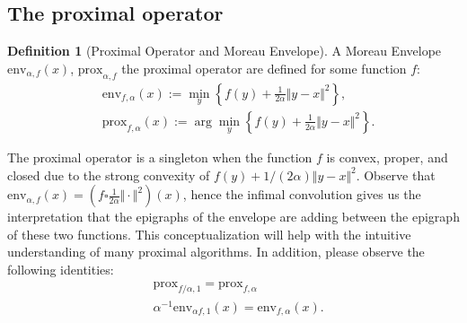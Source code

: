 \documentclass[]{article}
\theoremstyle{definition}
\newtheorem{prop}{Proposition}[section]  %
\newtheorem{definition}{Definition}
\begin{document}
    \subsection{The proximal operator}
        \begin{definition}[Proximal Operator and Moreau Envelope]
            A Moreau Envelope $\text{env}_{\alpha, f}(x)$, $\text{prox}_{\alpha, f}$ the proximal operator are defined for some function $f$: 
            \begin{align*}
                & \text{env}_{f, \alpha}(x) := \min_{y}\left\lbrace
                    f(y) + \frac{1}{2 \alpha }\Vert y - x\Vert^2
                \right\rbrace, 
                \\
                & \text{prox}_{f, \alpha}(x) := 
                \arg\min_{y}\left\lbrace
                    f(y) + \frac{1}{2\alpha} \Vert y - x\Vert^2
                \right\rbrace. 
            \end{align*}
        \end{definition}
        The proximal operator is a singleton when the function $f$ is convex, proper, and closed due to the strong convexity of $f(y) + 1/(2\alpha)\Vert y - x\Vert^2$. Observe that $\text{env}_{\alpha, f}(x) = (f\square \frac{1}{2\alpha}\Vert \cdot \Vert^2)(x)$, hence the infimal convolution gives us the interpretation that the epigraphs of the envelope are adding between the epigraph of these two functions. This conceptualization will help with the intuitive understanding of many proximal algorithms. 
        In addition, please observe the following identities: 
        $$
        \begin{aligned}
            & \text{prox}_{f/\alpha, 1} =  \text{prox}_{f, \alpha}
            \\
            & \alpha^{-1}\text{env}_{\alpha f, 1}(x) = \text{env}_{f, \alpha}(x). 
        \end{aligned}
        $$
\end{document}
